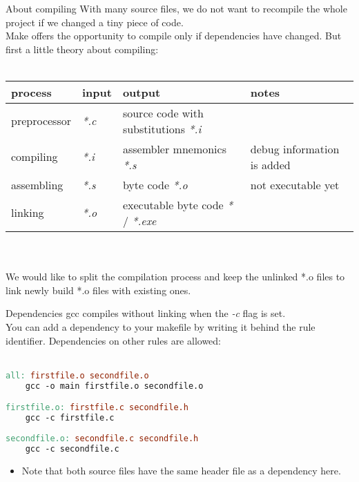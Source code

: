 \begin{frame}{About compiling}
	With many source files, we do not want to recompile the whole project if we changed a tiny piece of code.\\
	Make offers the opportunity to compile only if dependencies have changed. But first a little theory about compiling:\\\ \\
	\scriptsize
	\centering
	\begin{tabular}{|l|l|l|l|}
	\hline
	\textbf{process}	&	\textbf{input}	&	\textbf{output}										&	\textbf{notes}				\\\hline
	preprocessor		&	\textit{*.c}	&	source code with substitutions \textit{*.i}			&								\\\hline
	compiling			&	\textit{*.i}	&	assembler mnemonics \textit{*.s}					&	debug information is added	\\\hline
	assembling			&	\textit{*.s}	&	byte code \textit{*.o}								&	not executable yet			\\\hline
	linking				&	\textit{*.o}	&	executable byte code \textit{*} / \textit{*.exe}	&								\\\hline				
	\end{tabular}\ \\\ \\
	\flushleft
	\normalsize
	We would like to split the compilation process and keep the unlinked *.o files to link newly build *.o files with existing ones.
\end{frame}

\begin{frame}[fragile]{Dependencies}
	gcc compiles without linking when the \textit{-c} flag is set.\\
	You can add a dependency to your makefile by writing it behind the rule identifier. Dependencies on other rules are allowed:\\\ \\
	\begin{lstlisting}[language=make,basicstyle=\scriptsize,numbers=none]
all: firstfile.o secondfile.o 
	gcc -o main firstfile.o secondfile.o

firstfile.o: firstfile.c secondfile.h
	gcc -c firstfile.c
	
secondfile.o: secondfile.c secondfile.h
	gcc -c secondfile.c
\end{lstlisting}
	\begin{itemize}
		\item Note that both source files have the same header file as a dependency here.
	\end{itemize}
\end{frame}

